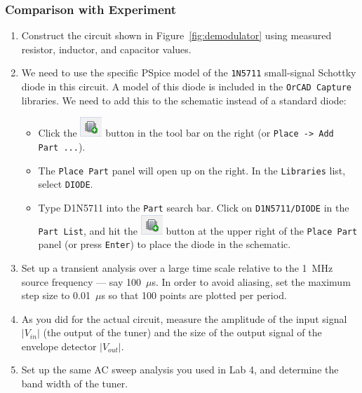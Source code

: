 \documentclass[11pt]{article}
\begin{document}
\subsubsection*{Comparison with Experiment}
\begin{enumerate}
\item Construct the circuit shown in Figure~\ref{fig:demodulator}
  using measured resistor, inductor, and capacitor values.

\item We need to use the specific PSpice model of the \texttt{1N5711}
  small-signal Schottky diode in this circuit. A model of this diode
  is included in the \texttt{OrCAD Capture} libraries. We need to add
  this to the schematic instead of a standard diode:
  \begin{itemize}
  \item Click the \includegraphics{OrCAD_AddPart.png} button in the
    tool bar on the right (or \texttt{Place -> Add Part ...}).

  \item The \texttt{Place Part} panel will open up on the right. In
    the \texttt{Libraries} list, select \texttt{DIODE}.

  \item Type D1N5711 into the \texttt{Part} search bar. Click on
    \texttt{D1N5711/DIODE} in the \texttt{Part List}, and hit the 
    \includegraphics{OrCAD_AddPart.png} button at the upper right of
    the \texttt{Place Part} panel (or press \texttt{Enter}) to place
    the diode in the schematic. 
  \end{itemize}

\item Set up a transient analysis over a large time scale relative to
  the 1~MHz source frequency --- say 100~$\mu$s. In order to avoid
  aliasing, set the maximum step size to 0.01~$\mu$s so that 100
  points are plotted per period.

\item As you did for the actual circuit, measure the amplitude of the
  input signal $|V_{in}|$ (the output of the tuner) and the size of
  the output signal of the envelope detector $|V_{out}|$.

\item Set up the same AC sweep analysis you used in Lab 4, and
  determine the band width of the tuner.
\end{enumerate}
\end{document}
